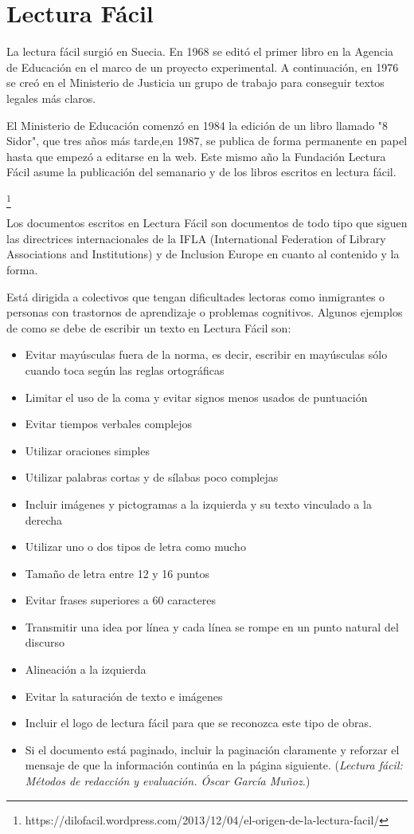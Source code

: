 \section{Lectura Fácil}


La lectura fácil surgió en Suecia. En 1968 se editó el primer libro en la Agencia de Educación en el marco de un proyecto experimental. A continuación, en 1976 se creó en el Ministerio de Justicia un grupo de trabajo para conseguir textos legales más claros.

El Ministerio de Educación comenzó en 1984 la edición de un libro llamado  "8 Sidor", que tres años más tarde,en 1987, se publica de forma permanente en papel hasta que empezó a editarse en la web. Este mismo año la Fundación Lectura Fácil asume la publicación del semanario y de los libros escritos en lectura fácil.


\footnote{https://dilofacil.wordpress.com/2013/12/04/el-origen-de-la-lectura-facil/}

Los documentos escritos en Lectura Fácil son documentos de todo tipo que siguen las directrices internacionales de la IFLA (International Federation of Library Associations and Institutions) y de Inclusion Europe en cuanto al contenido y la forma.

Está dirigida a colectivos que tengan dificultades lectoras como inmigrantes o personas con trastornos de aprendizaje o problemas cognitivos.
Algunos ejemplos de como se debe de escribir un texto en Lectura Fácil son:
\begin{itemize}
	\item Evitar mayúsculas fuera de la norma, es decir, escribir en mayúsculas sólo cuando toca según las reglas ortográficas
	\item Limitar el uso de la coma y evitar signos menos usados de puntuación
	\item Evitar tiempos verbales complejos
	\item Utilizar oraciones simples
	\item Utilizar palabras cortas y de sílabas poco complejas
	\item Incluir imágenes y pictogramas a la izquierda y su texto vinculado a la derecha
	\item Utilizar uno o dos tipos de letra como mucho
	\item Tamaño de letra entre 12 y 16 puntos
	\item Evitar frases superiores a 60 caracteres
	\item Transmitir una idea por línea y cada línea se rompe en un punto natural del discurso
	\item Alineación a la izquierda
	\item Evitar la saturación de texto e imágenes
	\item Incluir el logo de lectura fácil para que se reconozca este tipo de obras. 
	\item Si el documento está paginado, incluir la paginación claramente y reforzar el mensaje de que la información continúa en la página siguiente.
	(\textit {Lectura fácil: Métodos de redacción y evaluación.  Óscar García Muñoz.})	
\end{itemize}

